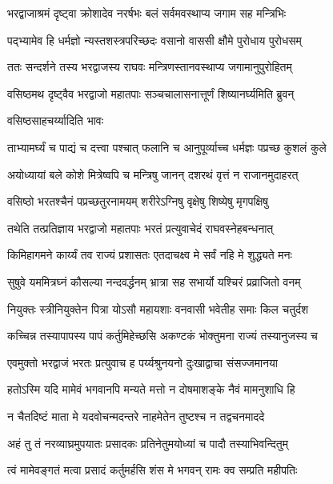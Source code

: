
\twolineshloka
{भरद्वाजाश्रमं दृष्ट्वा क्रोशादेव नरर्षभः}
{बलं सर्वमवस्थाप्य जगाम सह मन्त्रिभिः} %

\twolineshloka
{पद्भ्यामेव हि धर्मज्ञो न्यस्तशस्त्रपरिच्छदः}
{वसानो वाससी क्षौमे पुरोधाय पुरोधसम्} %

\twolineshloka
{ततः सन्दर्शने तस्य भरद्वाजस्य राघवः}
{मन्त्रिणस्तानवस्थाप्य जगामानुपुरोहितम्} %

\twolineshloka
{वसिष्ठमथ दृष्ट्वैव भरद्वाजो महातपाः}
{सञ्चचालासनात्तूर्णं शिष्यानर्घ्यमिति ब्रुवन्} %

\onelineshloka
{वसिष्ठसाहचर्य्यादिति भावः} %

\twolineshloka
{ताभ्यामर्घ्यं च पाद्यं च दत्त्वा पश्चात् फलानि च}
{आनुपूर्व्याच्च धर्मज्ञः पप्रच्छ कुशलं कुले} %

\twolineshloka
{अयोध्यायां बले कोशे मित्रेष्वपि च मन्त्रिषु}
{जानन् दशरथं वृत्तं न राजानमुदाहरत्} %

\twolineshloka
{वसिष्ठो भरतश्चैनं पप्रच्छतुरनामयम्}
{शरीरेऽग्निषु वृक्षेषु शिष्येषु मृगपक्षिषु} %

\twolineshloka
{तथेति तत्प्रतिज्ञाय भरद्वाजो महातपाः}
{भरतं प्रत्युवाचेदं राघवस्नेहबन्धनात्} %

\twolineshloka
{किमिहागमने कार्य्यं तव राज्यं प्रशासतः}
{एतदाचक्ष्व मे सर्वं नहि मे शुद्ध्यते मनः} %

\twolineshloka
{सुषुवे यममित्रघ्नं कौसल्या नन्दवर्द्धनम्}
{भ्रात्रा सह सभार्यो यश्चिरं प्रव्राजितो वनम्} %

\twolineshloka
{नियुक्तः स्त्रीनियुक्तेन पित्रा योऽसौ महायशाः}
{वनवासी भवेतीह समाः किल चतुर्दश} %

\twolineshloka
{कच्चिन्न तस्यापापस्य पापं कर्तुमिहेच्छसि}
{अकण्टकं भोक्तुमना राज्यं तस्यानुजस्य च} %

\twolineshloka
{एवमुक्तो भरद्वाजं भरतः प्रत्युवाच ह}
{पर्य्यश्रुनयनो दुःखाद्वाचा संसज्जमानया} %

\twolineshloka
{हतोऽस्मि यदि मामेवं भगवानपि मन्यते}
{मत्तो न दोषमाशङ्के नैवं मामनुशाधि हि} %

\twolineshloka
{न चैतदिष्टं माता मे यदवोचन्मदन्तरे}
{नाहमेतेन तुष्टश्च न तद्वचनमाददे} %

\twolineshloka
{अहं तु तं नरव्याघ्रमुपयातः प्रसादकः}
{प्रतिनेतुमयोध्यां च पादौ तस्याभिवन्दितुम्} %

\twolineshloka
{त्वं मामेवङ्गतं मत्वा प्रसादं कर्तुमर्हसि}
{शंस मे भगवन् रामः क्व सम्प्रति महीपतिः} %


